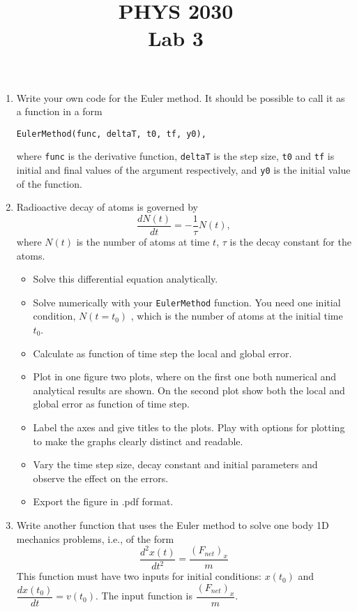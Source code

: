 \documentclass[letterpaper]{article}
\title{PHYS 2030 \\Lab 3}
\begin{document}
\maketitle

\begin{enumerate}
\item Write your own code for the Euler method. It should be possible to call it as a function in a form
\begin{verbatim}
EulerMethod(func, deltaT, t0, tf, y0),
\end{verbatim}
where \verb|func| is the derivative function, \verb|deltaT| is the step size, \verb|t0| and \verb|tf| is initial and final values of the argument respectively, and \verb|y0| is the initial value of the function.
\item Radioactive decay of atoms is governed by 
\begin{equation*}
\dfrac{dN(t)}{dt}=-\dfrac{1}{\tau}N(t),
\end{equation*}
where $N(t)$ is the number of atoms at time $t$, $\tau$ is the decay constant for the atoms.
\begin{itemize}
\item Solve this differential equation analytically. 
\item Solve numerically with your \verb|EulerMethod| function. You need one initial condition, $N(t=t_{0})$ , which is the number of atoms at the initial time $t_0$.
\item Calculate as function of time step the local and global error. 
\item Plot in one figure two plots, where on the first one both numerical and analytical results are shown. On the second plot show both the local and global error as function of time step.
\item Label the axes and give titles to the plots. Play with options for plotting to make the graphs clearly distinct and readable.
\item Vary the time step size, decay constant and initial parameters and observe the effect on the errors.
\item Export the figure in .pdf format.
\end{itemize}
\item Write another function that uses the Euler method to solve one body 1D mechanics problems, i.e., of the form 
\begin{equation*}
\dfrac{d^2x(t)}{dt^2}=\dfrac{(F_{net})_{x}}{m}
\end{equation*}
This function must have two inputs for initial conditions: $x(t_0)$ and \mbox{$\dfrac{dx(t_0)}{dt}=v(t_0)$}. The input function is $\dfrac{(F_{net})_{x}}{m}$.

\end{enumerate}
\end{document}
